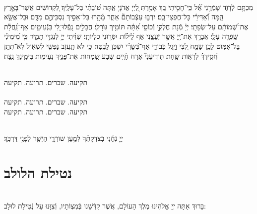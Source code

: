 \documentclass[twoside, openany, parskip=half, 11pt]{book}
\begin{document}
\begin{sometimes}

\\
%
מִכְתָּ֥ם לְֿדָוִ֑ד שָׁמְֿרֵ֥נִי אֵ֝֗ל כִּֽי־חָסִ֥יתִי בָֽךְ׃ אָמַ֣רְתְּ לַ֭יְיָ אֲדֹנָי֥ אַֽתָּה ט֝וֹבָתִ֗י בַּל־עָלֶֽיךָ׃ לִ֭קְדוֹשִׁים אֲשֶׁר־בָּאָ֣רֶץ הֵ֑מָּה וְֿ֝אַדִּירֵ֗י כׇּל־חֶפְצִי־בָֽם׃ יִרְבּ֥וּ עַצְּֿבוֹתָם֘ אַחֵ֢ר מָ֫הָ֥רוּ בַּל־אַסִּ֣יךְ נִסְכֵּיהֶ֣ם מִדָּ֑ם וּבַל־אֶשָּׂ֥א אֶת־שְׁ֝מוֹתָ֗ם עַל־שְׂפָתָֽי׃ יְיָ֗ מְֿנָת חֶלְקִ֣י וְֿכוֹסִ֑י אַ֝תָּ֗ה תּוֹמִ֥יךְ גּֽוֹרָלִֽי׃ חֲבָלִ֣ים נָֽפְֿלוּ־לִ֭י בַּנְּֿעִימִ֑ים אַף־נַֽ֝חֲלָ֗ת שָֽׁפְֿרָ֥ה עָלָֽי׃ אֲבָרֵ֣ךְ אֶת־יְ֖יָ אֲשֶׁ֣ר יְֿעָצָ֑נִי אַף לֵ֝יל֗וֹת יִסְּֿר֥וּנִי כִלְיוֹתָֽי׃ שִׁוִּ֨יתִי יְיָ֣ לְֿנֶגְדִּ֣י תָמִ֑יד כִּ֥י מִ֝ימִינִ֗י בַּל־אֶמּֽוֹט׃ לָכֵ֤ן שָׂמַ֣ח לִ֭בִּי וַיָּ֣גֶל כְּֿבוֹדִ֑י אַף־בְּֿ֝שָׂרִ֗י יִשְׁכֹּ֥ן לָבֶֽטַח׃ כִּ֤י לֹא תַֽעֲזֹ֣ב נַפְשִׁ֣י לִשְׁא֑וֹל לֹֽא־תִתֵּ֥ן חֲ֝סִֽידְֿךָ֗ לִרְא֥וֹת שָֽׁחַת׃ תּ֤וֹדִיעֵנִי֘ אֹ֢רַח חַ֫יִּ֥ים שׂ֣בַע שְֿׂ֭מָחוֹת אֶת־פָּנֶ֑יךָ נְֿעִימ֖וֹת בִּימִֽינְֿךָ֣ נֶֽצַח׃

\end{sometimes}



\begin{sometimes}

\\
תקיעה. שברים. תרועה. תקיעה\\
\\
תקיעה. שברים. תרועה. תקיעה\\
תקיעה. שברים. תרועה. תקיעה

\end{sometimes}

\vspace{-.5\baselineskip}

\\
 יְיָ֤ נְֿחֵ֬נִי בְֿצִדְקָתֶ֗ךָ לְֿמַ֥עַן שׁוֹרְֿרָ֑י הַיְֿשַׁ֖ר לְֿפָנַ֣י דַּרְכֶּֽךָ׃

\vfill

\quad{}\quad{}






\section[נטילת הלולב]{ נטילת הלולב }
\label{lulav}
\\
בָּרוּךְ אַתָּה יְיָ אֱלֹהֵינוּ מֶלֶךְ הָעוֹלָם, אֲשֶׁר קִדְּֿשָׁנוּ בְּֿמִצְוֹתָיו, וְֿצִוָּנוּ עַל נְֿטִילַת לוּלָב:
\end{document}
